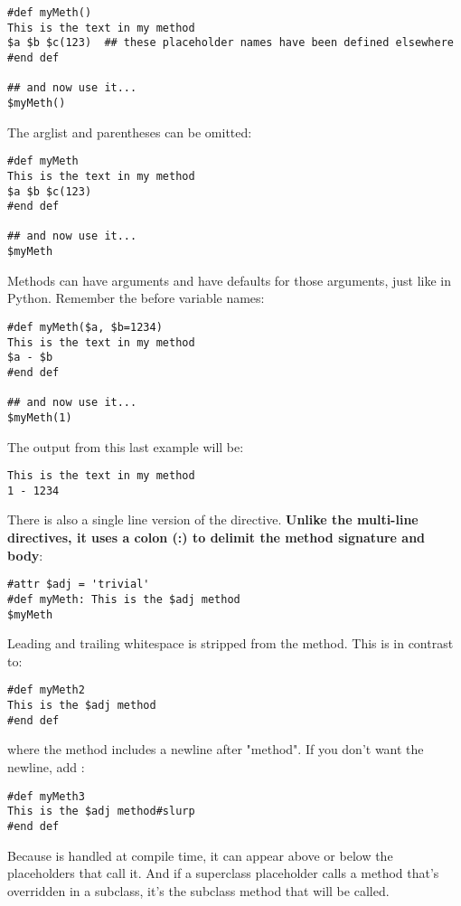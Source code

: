 \begin{verbatim}
#def myMeth()
This is the text in my method 
$a $b $c(123)  ## these placeholder names have been defined elsewhere
#end def

## and now use it...
$myMeth()
\end{verbatim}

The arglist and parentheses can be omitted:
\begin{verbatim}
#def myMeth
This is the text in my method 
$a $b $c(123)
#end def

## and now use it...
$myMeth
\end{verbatim}

Methods can have arguments and have defaults for those arguments, just like
in Python.  Remember the \code{\$} before variable names:
\begin{verbatim}
#def myMeth($a, $b=1234)
This is the text in my method 
$a - $b
#end def

## and now use it...
$myMeth(1)
\end{verbatim}

The output from this last example will be:

\begin{verbatim}
This is the text in my method 
1 - 1234
\end{verbatim}

There is also a single line version of the  directive.  
{\bf Unlike the multi-line directives, it uses a colon (:) to delimit the method
signature and body}:
\begin{verbatim}
#attr $adj = 'trivial'
#def myMeth: This is the $adj method 
$myMeth
\end{verbatim}
Leading and trailing whitespace is stripped from the method.  This is in
contrast to:
\begin{verbatim}
#def myMeth2
This is the $adj method
#end def
\end{verbatim}
where the method includes a newline after "method".  If you don't want the
newline, add :
\begin{verbatim}
#def myMeth3
This is the $adj method#slurp
#end def
\end{verbatim}

Because  is handled at compile time, it can appear above or
below the placeholders that call it.  And if a superclass placeholder
calls a method that's overridden in a subclass, it's the subclass method
that will be called.


